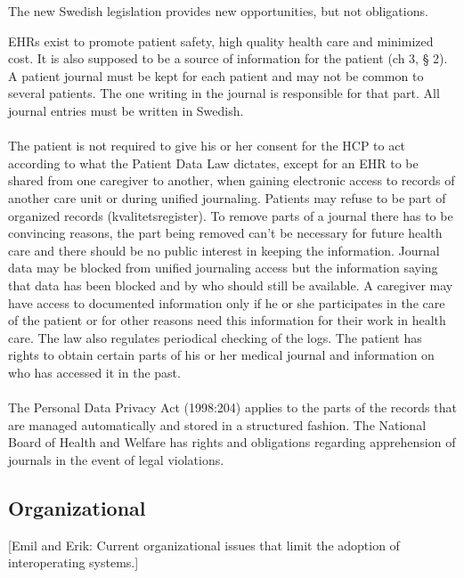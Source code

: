 \documentclass[14pt]{article}
\begin{document}

The new Swedish legislation provides new opportunities, but not obligations. \cite{RiR19}

\glspl{EHR} exist to promote patient safety, high quality health care and minimized cost. It is also supposed to be a source of information for the patient (ch 3, § 2). A patient journal must be kept for each patient and may not be common to several patients. The one writing in the journal is responsible for that part. All journal entries must be written in Swedish. \cite{PatientDataAct}
\\\\
The patient is not required to give his or her consent for the \gls{HCP} to act according to what the Patient Data Law dictates, except for an EHR to be shared from one caregiver to another, when gaining electronic access to records of another care unit or during unified journaling. Patients may refuse to be part of organized records (kvalitetsregister). To remove parts of a journal there has to be convincing reasons, the part being removed can't be necessary for future health care and there should be no public interest in keeping the information. Journal data may be blocked from unified journaling access but the information saying that data has been blocked and by who should still be available. A caregiver may have access to documented information only if he or she participates in the care of the patient or for other reasons need this information for their work in health care. The law also regulates periodical checking of the logs. The patient has rights to obtain certain parts of his or her medical journal and information on who has accessed it in the past.\cite{PatientDataAct}
\\\\
The Personal Data Privacy Act (1998:204) applies to the parts of the records that are managed automatically and stored in a structured fashion. The National Board of Health and Welfare has rights and obligations regarding apprehension of journals in the event of legal violations.\cite{PatientDataAct}

\subsection{Organizational}

[Emil and Erik: Current organizational issues that limit the adoption of interoperating systems.]
\end{document}
